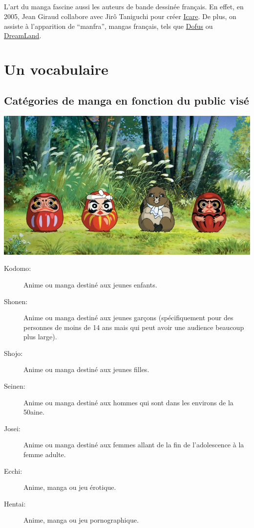 \paragraph{} L'art du manga fascine aussi les auteurs de bande dessinée
français. En effet, en 2005, Jean Giraud collabore avec Jirô Taniguchi pour
créer \underline{Icare}. De plus, on assiste à l'apparition de ``manfra'',
mangas français, tels que \underline{Dofus} ou \underline{DreamLand}.

\chapter{Un vocabulaire}

\section{Catégories de manga en fonction du public visé}

\begin{center}
	\includegraphics[scale=0.5]{Kodomo.jpg}
\end{center}

\begin{description}
	\item[Kodomo:] Anime ou manga destiné aux jeunes enfants.
	\item[Shonen:] Anime ou manga destiné aux jeunes garçons (spécifiquement
		pour des personnes de moins de 14 ans mais qui peut avoir une audience
		beaucoup plus large).
	\item[Shojo:] Anime ou manga destiné aux jeunes filles.
	\item[Seinen:] Anime ou manga destiné aux hommes qui sont dans les environs
		de la 50aine.
	\item[Josei:] Anime ou manga destiné aux femmes allant de la fin de
		l'adolescence à la femme adulte.
	\item[Ecchi:] Anime, manga ou jeu érotique.
	\item[Hentai:] Anime, manga ou jeu pornographique.
\end{description}

